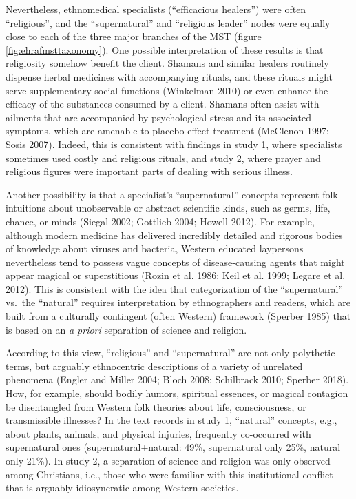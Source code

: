 \documentclass[
  11pt,
]{article}
\begin{document}
Nevertheless, ethnomedical specialists (``efficacious healers'') were often ``religious'', and the ``supernatural'' and ``religious leader'' nodes were equally close to each of the three major branches of the MST (figure \ref{fig:ehrafmsttaxonomy}). One possible interpretation of these results is that religiosity somehow benefit the client. Shamans and similar healers routinely dispense herbal medicines with accompanying rituals, and these rituals might serve supplementary social functions (Winkelman 2010) or even enhance the efficacy of the substances consumed by a client. Shamans often assist with ailments that are accompanied by psychological stress and its associated symptoms, which are amenable to placebo-effect treatment (McClenon 1997; Sosis 2007). Indeed, this is consistent with findings in study 1, where specialists sometimes used costly and religious rituals, and study 2, where prayer and religious figures were important parts of dealing with serious illness.

Another possibility is that a specialist's ``supernatural'' concepts represent folk intuitions about unobservable or abstract scientific kinds, such as germs, life, chance, or minds (Siegal 2002; Gottlieb 2004; Howell 2012). For example, although modern medicine has delivered incredibly detailed and rigorous bodies of knowledge about viruses and bacteria, Western educated laypersons nevertheless tend to possess vague concepts of disease-causing agents that might appear magical or superstitious (Rozin et al. 1986; Keil et al. 1999; Legare et al. 2012). This is consistent with the idea that categorization of the ``supernatural'' vs.~the ``natural'' requires interpretation by ethnographers and readers, which are built from a culturally contingent (often Western) framework (Sperber 1985) that is based on an \emph{a priori} separation of science and religion.

According to this view, ``religious'' and ``supernatural'' are not only polythetic terms, but arguably ethnocentric descriptions of a variety of unrelated phenomena (Engler and Miller 2004; Bloch 2008; Schilbrack 2010; Sperber 2018). How, for example, should bodily humors, spiritual essences, or magical contagion be disentangled from Western folk theories about life, consciousness, or transmissible illnesses? In the text records in study 1, ``natural'' concepts, e.g., about plants, animals, and physical injuries, frequently co-occurred with supernatural ones (supernatural+natural: 49\%, supernatural only 25\%, natural only 21\%). In study 2, a separation of science and religion was only observed among Christians, i.e., those who were familiar with this institutional conflict that is arguably idiosyncratic among Western societies.
\end{document}

